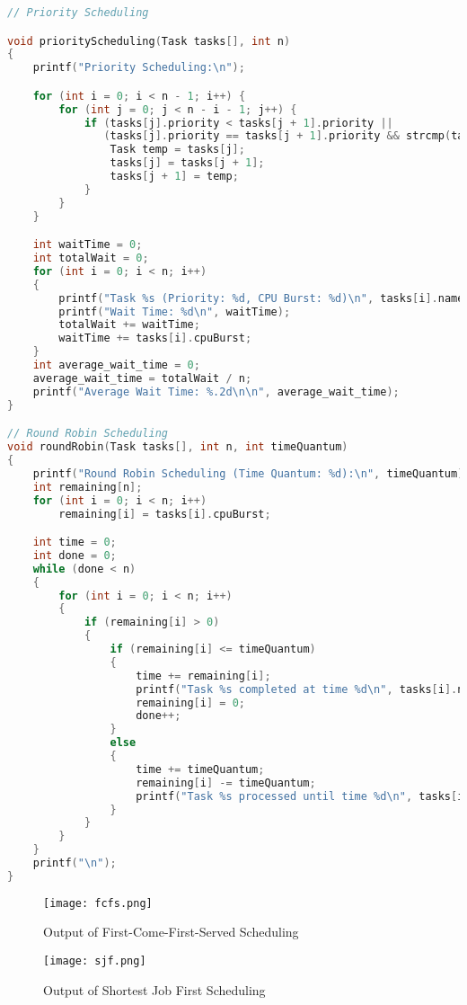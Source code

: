 \documentclass[12pt]{article}
\begin{document}
\begin{lstlisting}[language=C, caption={Scheduling Algorithms Code}]
// Priority Scheduling

void priorityScheduling(Task tasks[], int n)
{
    printf("Priority Scheduling:\n");

    for (int i = 0; i < n - 1; i++) {
        for (int j = 0; j < n - i - 1; j++) {
            if (tasks[j].priority < tasks[j + 1].priority || 
               (tasks[j].priority == tasks[j + 1].priority && strcmp(tasks[j].name, tasks[j + 1].name) > 0)) {
                Task temp = tasks[j];
                tasks[j] = tasks[j + 1];
                tasks[j + 1] = temp;
            }
        }
    }

    int waitTime = 0;
    int totalWait = 0;
    for (int i = 0; i < n; i++)
    {
        printf("Task %s (Priority: %d, CPU Burst: %d)\n", tasks[i].name, tasks[i].priority, tasks[i].cpuBurst);
        printf("Wait Time: %d\n", waitTime);
        totalWait += waitTime;
        waitTime += tasks[i].cpuBurst;
    }
    int average_wait_time = 0;
    average_wait_time = totalWait / n;
    printf("Average Wait Time: %.2d\n\n", average_wait_time);
}

// Round Robin Scheduling
void roundRobin(Task tasks[], int n, int timeQuantum)
{
    printf("Round Robin Scheduling (Time Quantum: %d):\n", timeQuantum);
    int remaining[n];
    for (int i = 0; i < n; i++)
        remaining[i] = tasks[i].cpuBurst;

    int time = 0;
    int done = 0;
    while (done < n)
    {
        for (int i = 0; i < n; i++)
        {
            if (remaining[i] > 0)
            {
                if (remaining[i] <= timeQuantum)
                {
                    time += remaining[i];
                    printf("Task %s completed at time %d\n", tasks[i].name, time);
                    remaining[i] = 0;
                    done++;
                }
                else
                {
                    time += timeQuantum;
                    remaining[i] -= timeQuantum;
                    printf("Task %s processed until time %d\n", tasks[i].name, time);
                }
            }
        }
    }
    printf("\n");
}
\end{lstlisting}



\begin{figure}[h!]
    \centering
    \texttt{[image: fcfs.png]}
    \caption{Output of First-Come-First-Served Scheduling}
    \label{fig:fcfs_output}
\end{figure}

\begin{figure}[h!]
    \centering
    \texttt{[image: sjf.png]}
    \caption{Output of Shortest Job First Scheduling}
    \label{fig:sjf_output}
\end{figure}
\end{document}
